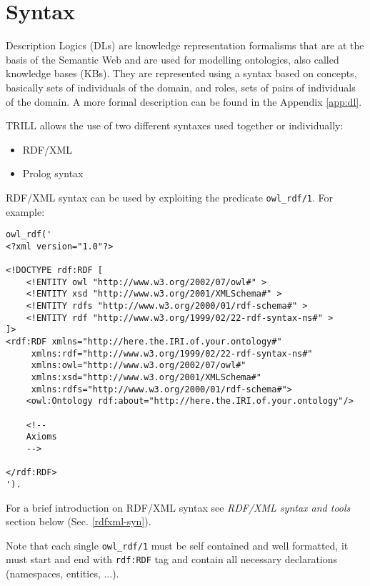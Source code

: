 \section{Syntax}
\label{syn}

Description Logics (DLs) are knowledge representation formalisms that are at the basis of the Semantic Web \cite{DBLP:conf/dlog/2003handbook,dlchap} and are used for modelling ontologies, also called knowledge bases (KBs).
They are represented using a syntax based on concepts, basically sets of individuals of the domain, and roles, sets of pairs of individuals
of the domain. A more formal description can be found in the Appendix \ref{app:dl}.

TRILL allows the use of two different syntaxes used together or individually:
\begin{itemize}
 \item RDF/XML
 \item Prolog syntax 
\end{itemize}

RDF/XML syntax can be used by exploiting the predicate \verb|owl_rdf/1|. For example:
\begin{small}
\begin{verbatim}
owl_rdf('
<?xml version="1.0"?>

<!DOCTYPE rdf:RDF [
    <!ENTITY owl "http://www.w3.org/2002/07/owl#" >
    <!ENTITY xsd "http://www.w3.org/2001/XMLSchema#" >
    <!ENTITY rdfs "http://www.w3.org/2000/01/rdf-schema#" >
    <!ENTITY rdf "http://www.w3.org/1999/02/22-rdf-syntax-ns#" >
]>
<rdf:RDF xmlns="http://here.the.IRI.of.your.ontology#"
     xmlns:rdf="http://www.w3.org/1999/02/22-rdf-syntax-ns#"
     xmlns:owl="http://www.w3.org/2002/07/owl#"
     xmlns:xsd="http://www.w3.org/2001/XMLSchema#"
     xmlns:rdfs="http://www.w3.org/2000/01/rdf-schema#">
    <owl:Ontology rdf:about="http://here.the.IRI.of.your.ontology"/>

    <!-- 
    Axioms
    -->

</rdf:RDF>
').
\end{verbatim}
\end{small}

For a brief introduction on RDF/XML syntax see \textit{RDF/XML syntax and tools} section below (Sec. \ref{rdfxml-syn}).

Note that each single \verb|owl_rdf/1| must be self contained and well formatted, it must start and end with \verb|rdf:RDF| tag and contain all necessary declarations (namespaces, entities, ...).


